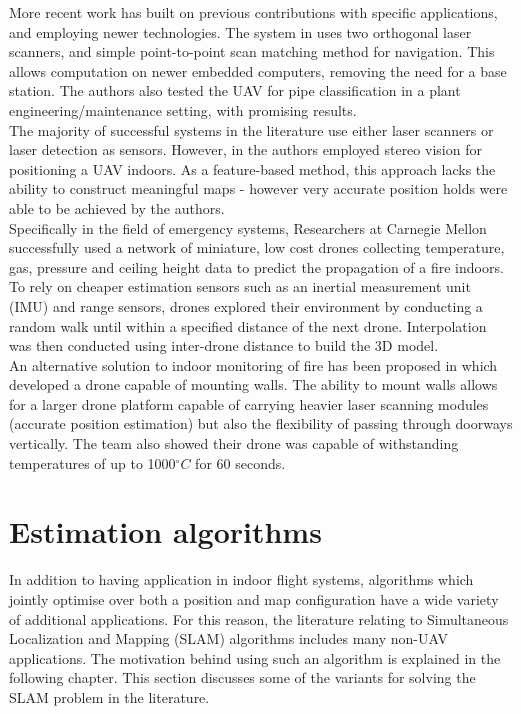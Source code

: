 \documentclass[capstone_report.tex]{subfiles}
\begin{document}
More recent work has built on previous contributions with specific applications, and employing newer technologies. The system in \cite{kumar} uses two orthogonal laser scanners, and simple point-to-point scan matching method for navigation. This allows computation on newer embedded computers, removing the need for a base station. The authors also tested the UAV for pipe classification in a plant engineering/maintenance setting, with promising results.\\

The majority of successful systems in the literature use either laser scanners or laser detection as sensors. However, in \cite{mustafah} the authors employed stereo vision for positioning a UAV indoors. As a feature-based method, this approach lacks the ability to construct meaningful maps - however very accurate position holds were able to be achieved by the authors.\\

Specifically in the field of emergency systems, Researchers at Carnegie Mellon \cite{sensorfly} successfully used a network of miniature, low cost drones collecting temperature, gas, pressure and ceiling height data to predict the propagation of a fire indoors.  To rely on cheaper estimation sensors such as an inertial measurement unit (IMU) and range sensors, drones explored their environment by conducting a random walk until within a specified distance of the next drone. Interpolation was then conducted using inter-drone distance to build the 3D model.\\

An alternative solution to indoor monitoring of fire has been proposed in \cite{myeong} which developed a drone capable of mounting walls.  The ability to mount walls allows for a larger drone platform capable of carrying heavier laser scanning modules (accurate position estimation) but also the flexibility of passing through doorways vertically.  The team also showed their drone was capable of withstanding temperatures of up to 1000$^\circ C$ for 60 seconds.\\

\section{Estimation algorithms}
In addition to having application in indoor flight systems, algorithms which jointly optimise over both a position and map configuration have a wide variety of additional applications. For this reason, the literature relating to Simultaneous Localization and Mapping (SLAM) algorithms includes many non-UAV applications. The motivation behind using such an algorithm is explained in the following chapter. This section discusses some of the variants for solving the SLAM problem in the literature.\\
\end{document}
